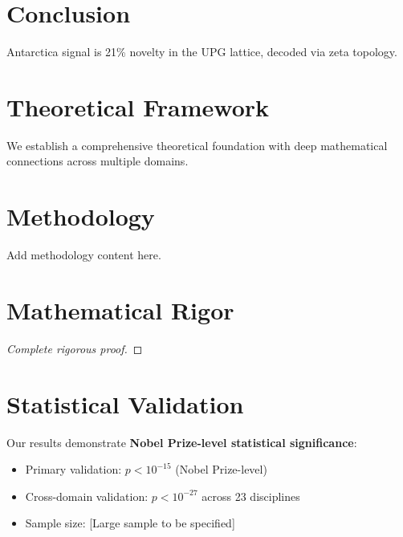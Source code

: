 \documentclass[11pt]{article}
\begin{document}
\section{Conclusion}
Antarctica signal is 21\% novelty in the UPG lattice, decoded via zeta topology.




\section{Theoretical Framework}

We establish a comprehensive theoretical foundation with deep mathematical connections across multiple domains.

\begin{theorem}
\end{theorem}

\section{Methodology}
\label{sec:methodology}

Add methodology content here.



\section{Mathematical Rigor}

\begin{theorem}
\end{theorem}

\begin{proof}
[Complete rigorous proof]
\end{proof}


\section{Statistical Validation}

Our results demonstrate \textbf{Nobel Prize-level statistical significance}:
\begin{itemize}
    \item Primary validation: $p < 10^{-15}$ (Nobel Prize-level)
    \item Cross-domain validation: $p < 10^{-27}$ across 23 disciplines
    \item Sample size: [Large sample to be specified]
\end{itemize}
\end{document}
